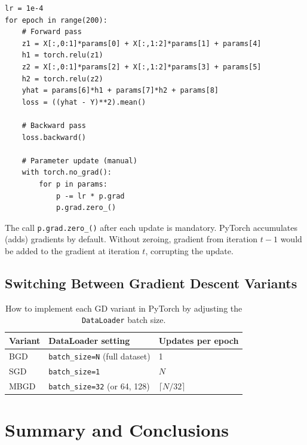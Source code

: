 \documentclass[12pt,a4paper]{article}
\begin{document}
\begin{verbatim}
lr = 1e-4
for epoch in range(200):
    # Forward pass
    z1 = X[:,0:1]*params[0] + X[:,1:2]*params[1] + params[4]
    h1 = torch.relu(z1)
    z2 = X[:,0:1]*params[2] + X[:,1:2]*params[3] + params[5]
    h2 = torch.relu(z2)
    yhat = params[6]*h1 + params[7]*h2 + params[8]
    loss = ((yhat - Y)**2).mean()

    # Backward pass
    loss.backward()

    # Parameter update (manual)
    with torch.no_grad():
        for p in params:
            p -= lr * p.grad
            p.grad.zero_()
\end{verbatim}

\begin{keyinsight}[title=Gradient zeroing]
The call \texttt{p.grad.zero\_()} after each update is mandatory.
PyTorch accumulates (adds) gradients by default.
Without zeroing, gradient from iteration $t-1$ would be added to the
gradient at iteration $t$, corrupting the update.
\end{keyinsight}

\subsection{Switching Between Gradient Descent Variants}

\begin{table}[ht]
\centering
\caption{How to implement each GD variant in PyTorch by adjusting the
         \texttt{DataLoader} batch size.}
\label{tab:pytorch-gd}
\begin{tabular}{lll}
\toprule
\textbf{Variant} & \textbf{DataLoader setting} & \textbf{Updates per epoch} \\
\midrule
BGD  & \texttt{batch\_size=N} (full dataset) & 1 \\
SGD  & \texttt{batch\_size=1}                & $N$ \\
MBGD & \texttt{batch\_size=32} (or 64, 128)  & $\lceil N/32 \rceil$ \\
\bottomrule
\end{tabular}
\end{table}

\section{Summary and Conclusions}
\label{sec:summary}
\end{document}
